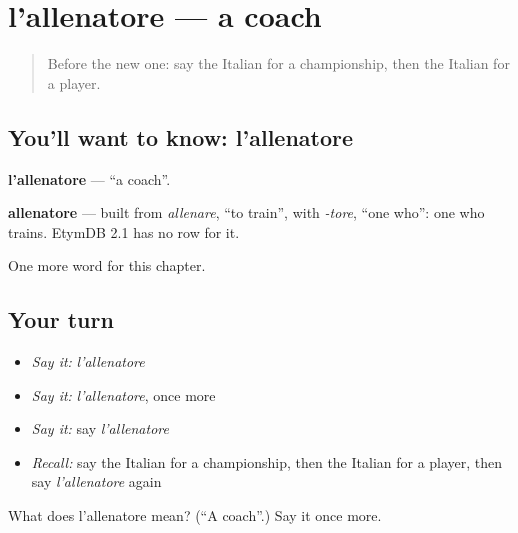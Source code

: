 \section[l'allenatore]{l'allenatore — a coach}

\label{lesson:IT-C231-allenatore}



\begin{quote}
Before the new one: say the Italian for a championship, then the Italian for a player.
\end{quote}

\subsection*{You'll want to know: l'allenatore}
\textbf{l'allenatore} — \textquotedblleft{}a coach\textquotedblright{}.

\begin{cousinweb}
\textbf{allenatore} — built from \emph{allenare}, \textquotedblleft{}to train\textquotedblright{}, with \emph{-tore}, \textquotedblleft{}one who\textquotedblright{}: one who trains. EtymDB 2.1 has no row for it.
\end{cousinweb}

\begin{grammarlens}[title={What you've built}]
One more word for this chapter.
\end{grammarlens}

\subsection*{Your turn}
\begin{itemize}
\raggedright
  \item \emph{Say it:} \emph{l'allenatore}
  \item \emph{Say it:} \emph{l'allenatore}, once more
  \item \emph{Say it:} say \emph{l'allenatore}
  \item \emph{Recall:} say the Italian for a championship, then the Italian for a player, then say \emph{l'allenatore} again
\end{itemize}

\begin{tcolorbox}[breakable,colback=teal!4,colframe=teal!35!black,title={Before you move on}]
What does l'allenatore mean? (\textquotedblleft{}A coach\textquotedblright{}.) Say it once more.
\end{tcolorbox}
